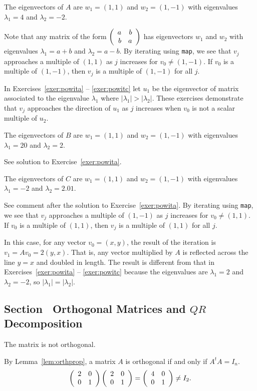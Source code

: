 \ans The eigenvectors of $A$ are $w_1 = (1,1)$ and
$w_2 = (1,-1)$ with eigenvalues $\lambda_1 = 4$ and $\lambda_2 = -2$.  

\soln Note that any matrix of the form $\left(\begin{array}{rr} a & b\\ b &a\end{array}\right)$
has eigenvectors $w_1$ and $w_2$ with eigenvalues
$\lambda_1 = a + b$ and $\lambda_2 = a - b$.
By iterating using {\tt map}, we see that $v_j$ approaches a multiple
of $(1,1)$ as $j$ increases for $v_0 \neq (1,-1)$.  If $v_0$ is a
multiple of $(1,-1)$, then $v_j$ is a multiple of $(1,-1)$ for all $j$.

\para In Exercises~\ref{exer:powita} -- \ref{exer:powitc} let $u_1$ be the
eigenvector of matrix associated to the eigenvalue $\lambda_1$ where
$|\lambda_1| > |\lambda_2|$. These exercises demonstrate that $v_j$ 
approaches the direction of $u_1$ as $j$ increases when $v_0$ is
not a scalar multiple of $u_2$.

\ans The eigenvectors of $B$ are $w_1 = (1,1)$ and $w_2 = (1,-1)$ with  
eigenvalues $\lambda_1 = 20$ and $\lambda_2 = 2$.  

\soln See solution to Exercise~\ref{exer:powita}.

\ans The eigenvectors of $C$ are $w_1 = (1,1)$ and $w_2 = (1,-1)$ with 
eigenvalues $\lambda_1 = -2$ and $\lambda_2 = 2.01$.  

\soln See comment after the solution to Exercise~\ref{exer:powita}.
By iterating using {\tt map}, we see that $v_j$ approaches a multiple
of $(1,-1)$ as $j$ increases for $v_0 \neq (1,1)$.  If $v_0$ is a
multiple of $(1,1)$, then $v_j$ is a multiple of $(1,1)$ for all $j$.

In this case, for any vector $v_0 = (x,y)$, the result of the iteration
is $v_1 = Av_0 = 2(y,x)$.  That is, any vector multiplied by $A$ is
reflected across the line $y = x$ and doubled in length.  The result
is different from that in Exercises~\ref{exer:powita} -- \ref{exer:powitc}
because the eigenvalues are $\lambda_1 = 2$ and $\lambda_2 = -2$, so
$|\lambda_1| = |\lambda_2|$.


\subsection*{Section~\protect{\ref{S:QR}} Orthogonal Matrices and $QR$
Decomposition}

 \ans The matrix is not orthogonal.

\soln By Lemma~\ref{lem:orthprop}, a matrix
$A$ is orthogonal if and only if $A^tA = I_n$.
\[
\left(\begin{array}{rr} 2 & 0\\ 0 &1\end{array}\right)\left(\begin{array}{rr} 2 & 0\\ 0 &1\end{array}\right) = \left(\begin{array}{rr} 4 & 0\\ 0 &1\end{array}\right) \neq I_2.
\]

